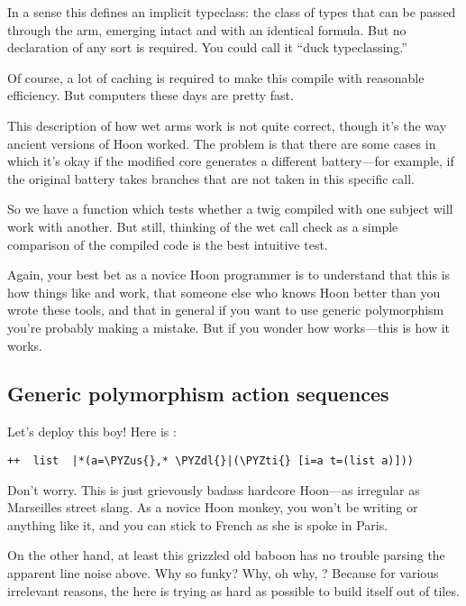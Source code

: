In a sense this defines an implicit typeclass: the class of types
that can be passed through the arm, emerging intact and with an
identical formula.  But no declaration of any sort is required.
You could call it ``duck typeclassing.''

Of course, a lot of caching is required to make this compile with
reasonable efficiency.  But computers these days are pretty fast.

This description of how wet arms work is not quite correct,
though it's the way ancient versions of Hoon worked.  The problem
is that there are some cases in which it's okay if the modified
core generates a different battery---for example, if the original
battery takes branches that are not taken in this specific call.

So we have a function  which tests whether a twig
compiled with one subject will work with another.  But still,
thinking of the wet call check as a simple comparison of the
compiled code is the best intuitive test.

Again, your best bet as a novice Hoon programmer is to understand
that this is how things like  and  work, that someone
else who knows Hoon better than you wrote these tools, and that
in general if you want to use generic polymorphism you're
probably making a mistake.  But if you wonder how  works---this is how it works.

\subsection{Generic polymorphism action sequences}

Let's deploy this boy!  Here is :

\begin{framed_shaded}
\begin{Verbatim}[fontsize=\relsize{-2.5},fontseries=b,commandchars=\\\{\}]
++  list  |*(a=\PYZus{},* \PYZdl{}|(\PYZti{} [i=a t=(list a)]))
\end{Verbatim}
\end{framed_shaded}
Don't worry.  This is just grievously badass hardcore Hoon---as
irregular as Marseilles street slang.  As a novice Hoon monkey,
you won't be writing  or anything like it, and you can
stick to French as she is spoke in Paris. 

On the other hand, at least this grizzled old baboon has no
trouble parsing the apparent line noise above.  Why so funky?
Why, oh why, \kode{\_,*}?  Because for various irrelevant reasons,
the  here is trying as hard as possible to build itself
out of tiles.

